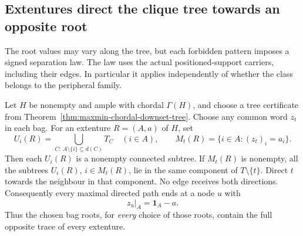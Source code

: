 \subsection{Extentures direct the clique tree towards an opposite root}
\label{sec:maxmin-extenture-tree-directions}

The root values may vary along the tree, but each forbidden pattern imposes
a signed separation law. The law uses the actual positioned-support
carriers, including their edges. In particular it applies independently of
whether the class belongs to the peripheral family.

\begin{proposition}
\label{prop:maxmin-extenture-opposite-bag-root}
Let $H$ be nonempty and ample with chordal $\Gamma(H)$, and choose a tree
certificate from Theorem~\ref{thm:maxmin-chordal-downset-tree}. Choose any
common word $z_t$ in each bag. For an extenture $R=(A,a)$ of $H$, set
\[
 U_i(R)=\bigcup_{C:\ A\setminus\{i\}\subseteq d(C)}T_C
 \quad(i\in A),\qquad
 M_t(R)=\{i\in A:(z_t)_i=a_i\}.
\]
Then each $U_i(R)$ is a nonempty connected subtree. If $M_t(R)$ is nonempty,
all the subtrees $U_i(R)$, $i\in M_t(R)$, lie in the same component of
$T\setminus\{t\}$. Direct $t$ towards the neighbour in that component.
No edge receives both directions. Consequently every maximal directed path ends
at a node $u$ with
\[
                     z_u|_A=\mathbf1_A-a.
\]
Thus the chosen bag roots, for \emph{every} choice of those roots, contain
the full opposite trace of every extenture.
\end{proposition}

